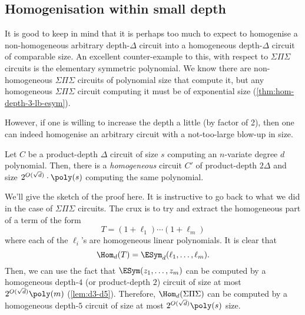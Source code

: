 \subsection{Homogenisation within small depth}

It is good to keep in mind that it is perhaps too much to expect to homogenise a non-homogeneous  arbitrary depth-$\Delta$ circuit into a homogeneous depth-$\Delta$ circuit of comparable size. An excellent counter-example to this, with respect to $\Sigma\Pi\Sigma$ circuits is the elementary symmetric polynomial. We know there are non-homogeneous $\Sigma\Pi\Sigma$ circuits of polynomial size that compute it, but any homogeneous $\Sigma\Pi\Sigma$ circuit computing it must be of exponential size (\autoref{thm:hom-depth-3-lb-esym}). 

However, if one is willing to increase the depth a little (by factor of 2), then one can indeed homogenise an arbitrary circuit with a not-too-large blow-up in size.

\begin{lemma}\label{homogenisation-within-constant-depth}
  Let $C$ be a product-depth $\Delta$ circuit of size $s$ computing an $n$-variate degree $d$ polynomial. Then, there is a \emph{homogeneous} circuit $C'$ of product-depth $2\Delta$ and size $2^{O(\sqrt{d})} \cdot \poly(s)$ computing the same polynomial. 
\end{lemma}

We'll give the sketch of the proof here. It is instructive to go back to what we did in the case of $\Sigma\Pi\Sigma$ circuits. The crux is to try and extract the homogeneous part of a term of the form
\[
  T = (1 + \ell_1)\cdots (1 + \ell_m)
\]
where each of the $\ell_i$'s are homogeneous linear polynomials. It is clear that
\[
  \Hom_{d}(T) = \ESym_d(\ell_1,\ldots, \ell_m).
\]
Then, we can use the fact that $\ESym(z_1,\ldots, z_m)$ can be computed by a homogeneous depth-$4$ (or product-depth $2$) circuit of size at most $2^{O(\sqrt{d})}\poly(m)$ (\autoref{lem:d3-d5}). Therefore, $\Hom_d(\Sigma\Pi\Sigma)$ can be computed by a homogeneous depth-$5$ circuit of size at most $2^{O(\sqrt{d})}\poly(s)$  size.


